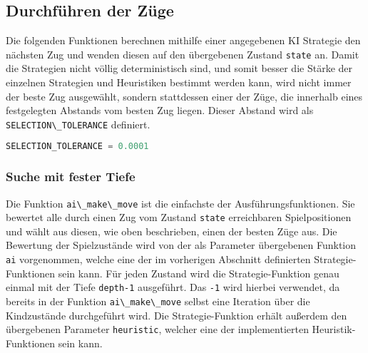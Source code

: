 \hypertarget{durchfuxfchren-der-zuxfcge}{%
\subsection{Durchführen der Züge}\label{durchfuxfchren-der-zuxfcge}}

Die folgenden Funktionen berechnen mithilfe einer angegebenen \ac{KI}
Strategie den nächsten Zug und wenden diesen auf den übergebenen Zustand
\passthrough{\lstinline!state!} an. Damit die Strategien nicht völlig
deterministisch sind, und somit besser die Stärke der einzelnen
Strategien und Heuristiken bestimmt werden kann, wird nicht immer der
beste Zug ausgewählt, sondern stattdessen einer der Züge, die innerhalb
eines festgelegten Abstands vom besten Zug liegen. Dieser Abstand wird
als \passthrough{\lstinline!SELECTION\_TOLERANCE!} definiert.

\begin{lstlisting}[language=Python]
SELECTION_TOLERANCE = 0.0001
\end{lstlisting}

\hypertarget{suche-mit-fester-tiefe}{%
\subsubsection{Suche mit fester Tiefe}\label{suche-mit-fester-tiefe}}

Die Funktion \passthrough{\lstinline!ai\_make\_move!} ist die einfachste
der Ausführungsfunktionen. Sie bewertet alle durch einen Zug vom Zustand
\passthrough{\lstinline!state!} erreichbaren Spielpositionen und wählt
aus diesen, wie oben beschrieben, einen der besten Züge aus. Die
Bewertung der Spielzustände wird von der als Parameter übergebenen
Funktion \passthrough{\lstinline!ai!} vorgenommen, welche eine der im
vorherigen Abschnitt definierten Strategie-Funktionen sein kann. Für
jeden Zustand wird die Strategie-Funktion genau einmal mit der Tiefe
\passthrough{\lstinline!depth-1!} ausgeführt. Das
\passthrough{\lstinline!-1!} wird hierbei verwendet, da bereits in der
Funktion \passthrough{\lstinline!ai\_make\_move!} selbst eine Iteration
über die Kindzustände durchgeführt wird. Die Strategie-Funktion erhält
außerdem den übergebenen Parameter \passthrough{\lstinline!heuristic!},
welcher eine der implementierten Heuristik-Funktionen sein kann.

